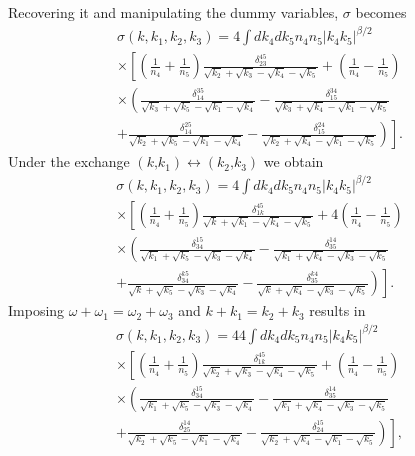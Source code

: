     Recovering it and manipulating the dummy variables, 
    $\sigma$ becomes
    \begin{multline}
      \sigma(k,k_1,k_2,k_3) =  4 \int dk_4dk_5n_4n_5|k_4k_5|^{\beta/2} \\
       \times \left[\left( \frac{1}{n_4}+\frac{1}{n_5} \right) 
      \frac{\delta_{23}^{45}}{\sqrt{k_2}+\sqrt{k_3}-\sqrt{k_4}-\sqrt{k_5}} \right.
      + \left( \frac{1}{n_4}-\frac{1}{n_5} \right) \\ 
      \times\left(\frac{\delta_{14}^{35}}{\sqrt{k_3}+\sqrt{k_5}-\sqrt{k_1}-\sqrt{k_4}} - \frac{\delta_{15}^{34}}{\sqrt{k_3} 
       +\sqrt{k_4}-\sqrt{k_1}-\sqrt{k_5}}  \right. \\
      \left. \left. +\frac{\delta_{14}^{25}}{\sqrt{k_2}+\sqrt{k_5}-\sqrt{k_1}-\sqrt{k_4}} -\frac{\delta_{15}^{24}}{\sqrt{k_2}
      +\sqrt{k_4}-\sqrt{k_1}-\sqrt{k_5}}\right)\right].
      \label{eqsym}
    \end{multline}
    Under the exchange $(k \text{,} k_1) \leftrightarrow (k_2 \text{,} k_3)$  we obtain
    \begin{multline}
      \sigma(k,k_1,k_2,k_3) =  4 \int dk_4dk_5n_4n_5|k_4k_5|^{\beta/2} \\
       \times \left[\left( \frac{1}{n_4}+\frac{1}{n_5} \right) 
      \frac{\delta_{1k}^{45}}{\sqrt{k}+\sqrt{k_1}-\sqrt{k_4}-\sqrt{k_5}} \right. 
      + 4\left( \frac{1}{n_4}-\frac{1}{n_5} \right) \\
      \times \left(\frac{\delta_{34}^{15}}{\sqrt{k_1}+\sqrt{k_5}-\sqrt{k_3}-\sqrt{k_4}} - \frac{\delta_{35}^{14}}{\sqrt{k_1} +\sqrt{k_4}-\sqrt{k_3}-\sqrt{k_5}}  \right. \\
      \left. \left. +\frac{\delta_{34}^{k5}}{\sqrt{k}+\sqrt{k_5}-\sqrt{k_3}-\sqrt{k_4}} -\frac{\delta_{35}^{k4}}{\sqrt{k}+\sqrt{k_4}-\sqrt{k_3}-\sqrt{k_5}}\right)\right].
    \end{multline}
    Imposing $\omega + \omega_1 = \omega_2 +\omega_3$ and $k + k_1 = k_2 + k_3$ results in
    \begin{multline}
      \sigma(k,k_1,k_2,k_3) =  44 \int dk_4dk_5n_4n_5|k_4k_5|^{\beta/2} \\
       \times \left[\left( \frac{1}{n_4}+\frac{1}{n_5} \right) 
      \frac{\delta_{1k}^{45}}{\sqrt{k_2}+\sqrt{k_3}-\sqrt{k_4}-\sqrt{k_5}} \right. 
      + \left( \frac{1}{n_4}-\frac{1}{n_5} \right) \\
      \times \left(\frac{\delta_{34}^{15}}{\sqrt{k_1}+\sqrt{k_5}-\sqrt{k_3}-\sqrt{k_4}} - \frac{\delta_{35}^{14}}{\sqrt{k_1} +\sqrt{k_4}-\sqrt{k_3}-\sqrt{k_5}}  \right. \\
      \left. \left. +\frac{\delta_{25}^{14}}{\sqrt{k_2}+\sqrt{k_5}-\sqrt{k_1}-\sqrt{k_4}} -\frac{\delta_{24}^{15}}{\sqrt{k_2}+\sqrt{k_4}-\sqrt{k_1}-\sqrt{k_5}}\right)\right],
    \end{multline}
